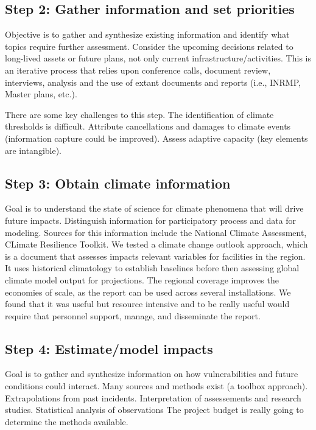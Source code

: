 \documentclass[10pt]{amsart}
\begin{document}
\subsection{Step 2: Gather information and set priorities}
Objective is to gather and synthesize existing information and identify what topics require further assessment.
Consider the upcoming decisions related to long-lived assets or future plans, not only current infrastructure/activities.
This is an iterative process that relies upon conference calls, document review, interviews, analysis and the use of extant documents and reports (i.e., INRMP, Master plans, etc.).

There are some key challenges to this step.
The identification of climate thresholds is difficult.
Attribute cancellations and damages to climate events (information capture could be improved).
Assess adaptive capacity (key elements are intangible).

\subsection{Step 3: Obtain climate information}
Goal is to understand the state of science for climate phenomena that will drive future impacts.
Distinguish information for participatory process and data for modeling.
Sources for this information include the National Climate Assessment, CLimate Resilience Toolkit.
We tested a climate change outlook approach, which is a document that assesses impacts relevant variables for facilities in the region.
It uses historical climatology to establish baselines before then assessing global climate model output for projections.
The regional coverage improves the economies of scale, as the report can be used across several installations.
We found that it was useful but resource intensive and to be really useful would require that personnel support, manage, and disseminate the report.

\subsection{Step 4: Estimate/model impacts}
Goal is to gather and synthesize information on how vulnerabilities and future conditions could interact.
Many sources and methods exist (a toolbox approach).
Extrapolations from past incidents.
Interpretation of assessements and research studies.
Statistical analysis of observations
The project budget is really going to determine the methods available.
 
\end{document}
